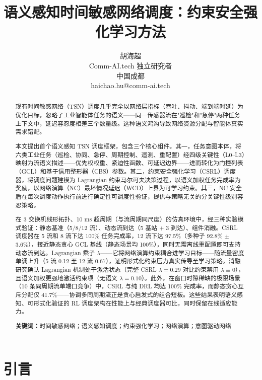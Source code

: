 \documentclass[UTF8]{ctexart}
\title{语义感知时间敏感网络调度：约束安全强化学习方法}
\author{
    胡海超\\
    \small Comm-AI.tech 独立研究者\\
    \small 中国成都\\
    \small haichao.hu@comm-ai.tech
}
\date{}
\begin{document}
\maketitle

\begin{abstract}

现有时间敏感网络（TSN）调度几乎完全以网络层指标（吞吐、抖动、端到端时延）为优化目标，忽略了工业智能体任务的语义——同一传感器流在"巡检"和"急停"两种任务上下文中，延迟容忍度相差三个数量级。这种语义鸿沟导致网络资源分配与智能体真实需求错配。

本文提出首个语义感知 TSN 调度框架，包含三个核心组件。其一，任务意图本体，将六类工业任务（巡检、协同、急停、周期控制、遥测、重配置）经四级关键性（L0--L3）映射为流语义描述——优先权权重、紧迫性函数、可延迟边界——进而转化为门控列表（GCL）和基于信用整形器（CBS）参数。其二，约束安全强化学习（CSRL）调度器，将调度问题建模为 Lagrangian 约束马尔可夫决策过程，以语义加权任务完成率为奖励，以网络演算（NC）最坏情况延迟（WCD）上界为可学习约束。其三，NC 安全盾在每次调度动作执行前进行确定性可调度性验证，提供与策略无关的分关键性级别容忍策略。

在 3 交换机线形拓扑、10 ms 超周期（与流周期同尺度）的仿真环境中，经三种实验模式验证：静态基准（5/8/12 流）、动态流到达（5 基站 + 3 到达）、组件消融。CSRL 调度器在 5 流和 8 流下达 100\% 任务完成率，12 流下达 97.5\%（多种子 92.8\% $\pm$ 3.6\%），接近静态贪心 GCL 基线（静态场景均 100\%），同时无需离线重配置即可支持动态流到达。Lagrangian 乘子 $\lambda$——它将网络演算约束耦合进学习目标——随流量密度单调上升（5 流 0.12 至 12 流 0.67），证明形式化约束压力真实传导至学习策略。消融研究确认 Lagrangian 机制处于激活状态（完整 CSRL $\lambda=0.29$ 对比约束禁用 $\lambda\equiv0$），且语义加权更强地激活约束项（无语义 $\lambda=0.10$）。此外，在窗口时隙稀缺的极限场景（10 条同周期流单端口竞争）中，CSRL 与纯 DRL 均达 100\% 完成率，而静态贪心互斥分配仅 41.7\%——协调多同周期流正是贪心启发式的组合短板。这些结果表明语义感知、可形式化验证的 RL 调度架构在性能上与经典调度器可比，同时保留在线适应能力。

\textbf{关键词：}时间敏感网络；语义感知调度；约束强化学习；网络演算；意图驱动网络

\end{abstract}

\section{引言}
\end{document}
